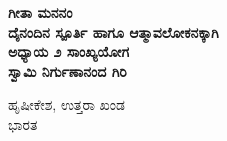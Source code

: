 \begin{titlepage}
    \begin{center}
        \vspace*{0.5cm}
            
        {\Huge
        \textbf{\color{blue}\fontsize{50}{60}\selectfont ಗೀತಾ ಮನನಂ}}
        \textbf{\\ \small \color{black}ದೈನಂದಿನ ಸ್ಪೂರ್ತಿ ಹಾಗೂ ಆತ್ಮಾವಲೋಕನಕ್ಕಾಗಿ}\\ 
		\vspace{1.0cm}
		\textbf{{\large\color{black} ಅಧ್ಯಾಯ ೨ ಸಾಂಖ್ಯಯೋಗ}} 		
        \vspace{3.0cm}\\
        \textbf{{\Large \color{blue}\mananamfont ಸ್ವಾಮಿ ನಿರ್ಗುಣಾನಂದ ಗಿರಿ}}\\  
		
		
        
		
            
        \vfill
            
        
            
        \vspace{0.1cm}
        {\color{black}    
		
		{{\large \color{blue}ಹೃಷೀಕೇಶ, ಉತ್ತರಾ ಖಂಡ}\\\normalsize ಭಾರತ}
        }
    \end{center}
\end{titlepage}
\nopagecolor%